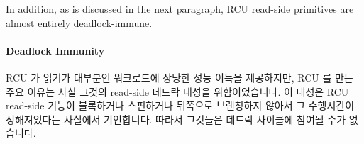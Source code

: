 In addition, as is discussed in the next paragraph,
RCU read-side primitives are almost entirely deadlock-immune.

\fi


\paragraph{Deadlock Immunity}

RCU 가 읽기가 대부분인 워크로드에 상당한 성능 이득을 제공하지만, RCU 를 만든
주요 이유는 사실 그것의 read-side 데드락 내성을 위함이었습니다.
이 내성은 RCU read-side 기능이 블록하거나 스핀하거나 뒤쪽으로 브랜칭하지 않아서
그 수행시간이 정해져있다는 사실에서 기인합니다.
따라서 그것들은 데드락 사이클에 참여될 수가 없습니다.

